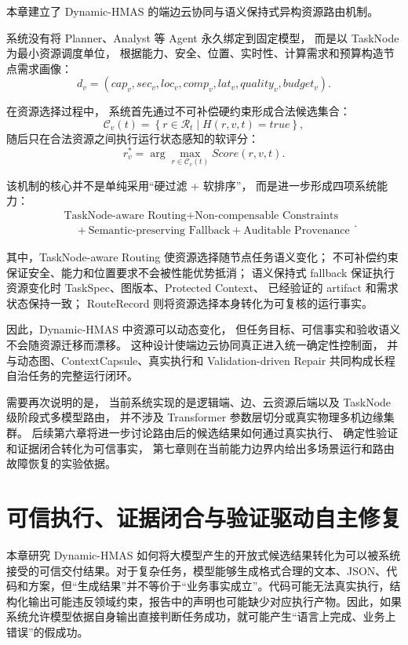 \documentclass[UTF8,a4paper,12pt,oneside]{ctexbook}
\begin{document}
本章建立了 Dynamic-HMAS 的端边云协同与语义保持式异构资源路由机制。

系统没有将 Planner、Analyst 等 Agent 永久绑定到固定模型，
而是以 TaskNode 为最小资源调度单位，
根据能力、安全、位置、实时性、计算需求和预算构造节点需求画像：
\[
d_v=
(
cap_v,
sec_v,
loc_v,
comp_v,
lat_v,
quality_v,
budget_v
).
\]

在资源选择过程中，
系统首先通过不可补偿硬约束形成合法候选集合：
\[
\mathcal{C}_v(t)
=
\left\{
r\in\mathcal{R}_t
\mid
H(r,v,t)=true
\right\},
\]
随后只在合法资源之间执行运行状态感知的软评分：
\[
r_v^{*}
=
\arg\max_{r\in\mathcal{C}_v(t)}
Score(r,v,t).
\]

该机制的核心并不是单纯采用“硬过滤 + 软排序”，
而是进一步形成四项系统能力：
\[
\boxed{
\begin{aligned}
&\text{TaskNode-aware Routing}
+ \text{Non-compensable Constraints} \\[3pt]
&\quad {}+ \text{Semantic-preserving Fallback}
+ \text{Auditable Provenance}
\end{aligned}
}.
\]

其中，TaskNode-aware Routing 使资源选择随节点任务语义变化；
不可补偿约束保证安全、能力和位置要求不会被性能优势抵消；
语义保持式 fallback 保证执行资源变化时
TaskSpec、图版本、Protected Context、
已经验证的 artifact 和需求状态保持一致；
RouteRecord 则将资源选择本身转化为可复核的运行事实。

因此，Dynamic-HMAS 中资源可以动态变化，
但任务目标、可信事实和验收语义不会随资源迁移而漂移。
这种设计使端边云协同真正进入统一确定性控制面，
并与动态图、ContextCapsule、真实执行和 Validation-driven Repair
共同构成长程自治任务的完整运行闭环。

需要再次说明的是，
当前系统实现的是逻辑端、边、云资源后端以及
TaskNode 级阶段式多模型路由，
并不涉及 Transformer 参数层切分或真实物理多机边缘集群。
后续第六章将进一步讨论路由后的候选结果如何通过真实执行、
确定性验证和证据闭合转化为可信事实，
第七章则在当前能力边界内给出多场景运行和路由故障恢复的实验依据。

\chapter{可信执行、证据闭合与验证驱动自主修复}

本章研究 Dynamic-HMAS 如何将大模型产生的开放式候选结果转化为可以被系统接受的可信交付结果。对于复杂任务，模型能够生成格式合理的文本、JSON、代码和方案，但“生成结果”并不等价于“业务事实成立”。代码可能无法真实执行，结构化输出可能违反领域约束，报告中的声明也可能缺少对应执行产物。因此，如果系统允许模型依据自身输出直接判断任务成功，就可能产生“语言上完成、业务上错误”的假成功。
\end{document}
